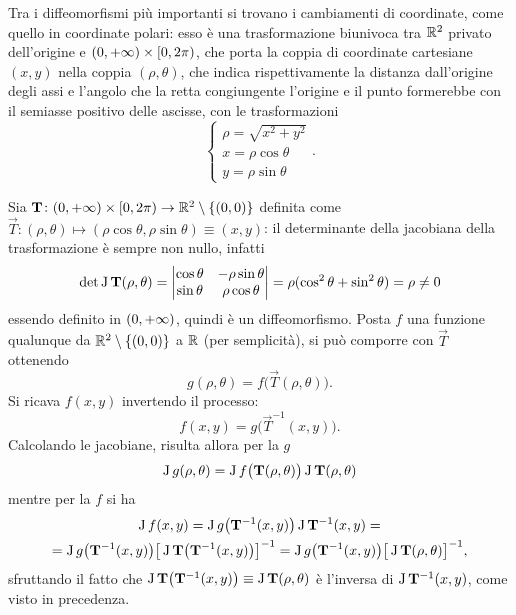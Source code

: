 Tra i diffeomorfismi più importanti si trovano i cambiamenti di coordinate, come quello in coordinate polari: esso è una trasformazione biunivoca tra $\mathbb{R}^2$ privato dell'origine e $(0,+\infty)\times[0,2\pi)$, che porta la coppia di coordinate cartesiane $(x,y)$ nella coppia $(\rho,\theta)$, che indica rispettivamente la distanza dall'origine degli assi e l'angolo che la retta congiungente l'origine e il punto formerebbe con il semiasse positivo delle ascisse, con le trasformazioni
\begin{equation}
\begin{cases}
\rho=\sqrt{x^2+y^2}\\
x=\rho\cos\theta\\
y=\rho\sin\theta
\end{cases}.
\end{equation}

Sia $\mathbf{T}\colon(0,+\infty)\times[0,2\pi)\to\mathbb{R}^2\setminus\{(0,0)\}$ definita come $\vec T\colon(\rho,\theta)\mapsto(\rho\cos\theta,\rho\sin\theta)\equiv(x,y)$: il determinante della jacobiana della trasformazione è sempre non nullo, infatti
\[
\det\operatorname{J}\mathbf{T}(\rho,\theta)=
	\begin{vmatrix}
	\cos\theta	&-\rho\sin\theta\\
	\sin\theta	&\rho\cos\theta
	\end{vmatrix}
=\rho(\cos^2\theta+\sin^2\theta)=\rho\neq 0
\]
essendo definito in $(0,+\infty)$, quindi è un diffeomorfismo.
Posta $f$ una funzione qualunque da $\mathbb{R}^2\setminus\{(0,0)\}$ a $\mathbb{R}$ (per semplicità), si può comporre con $\vec T$ ottenendo
\[
g(\rho,\theta)=f\big(\vec T(\rho,\theta)\big).
\]
Si ricava $f(x,y)$ invertendo il processo:
\[
f(x,y)=g\big(\vec T^{-1}(x,y)\big).
\]
Calcolando le jacobiane, risulta allora per la $g$
\begin{equation} \label{eq:composizione_jacobiane_polari1}
\operatorname{J} g(\rho,\theta)=\operatorname{J} f\big(\mathbf{T}(\rho,\theta)\big)\operatorname{J}\mathbf{T}(\rho,\theta)
\end{equation}
mentre per la $f$ si ha
\begin{multline} \label{eq:composizione_jacobiane_polari2}
\operatorname{J} f(x,y)=\operatorname{J} g\big(\mathbf{T}^{-1}(x,y)\big)\operatorname{J}\mathbf{T}^{-1}(x,y)=\\
=\operatorname{J} g\big(\mathbf{T}^{-1}(x,y)\big)\big[\operatorname{J}\mathbf{T}\big(\mathbf{T}^{-1}(x,y)\big)\big]^{-1}=\operatorname{J} g\big(\mathbf{T}^{-1}(x,y)\big)\big[\operatorname{J}\mathbf{T}(\rho,\theta)\big]^{-1},
\end{multline}
sfruttando il fatto che $\operatorname{J}\mathbf{T}\big(\mathbf{T}^{-1}(x,y)\big)\equiv\operatorname{J}\mathbf{T}(\rho,\theta)$ è l'inversa di $\operatorname{J}\mathbf{T}^{-1}(x,y)$, come visto in precedenza.


